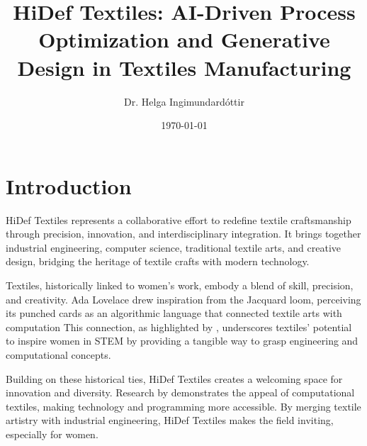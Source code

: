 \documentclass{article}
\title{HiDef Textiles: AI-Driven Process Optimization and Generative Design in Textiles Manufacturing}
\author{Dr. Helga Ingimundardóttir}
\date{\today}
\begin{document}
    \maketitle



    \section{Introduction}

    HiDef Textiles represents a collaborative effort to redefine textile craftsmanship through precision, innovation,
    and interdisciplinary integration. It brings together industrial engineering, computer science, traditional
    textile arts, and creative design, bridging the heritage of textile crafts with modern technology.

    Textiles, historically linked to women's work, embody a blend of skill, precision, and creativity. Ada Lovelace
    drew inspiration from the Jacquard loom, perceiving its punched cards as an algorithmic language that connected
    textile arts with computation
    This connection, as highlighted by \citet{sadieplant}, underscores textiles' potential to inspire women in STEM by
    providing a tangible way to grasp engineering and computational concepts.

    Building on these historical ties, HiDef Textiles creates a welcoming space for innovation and diversity.
    Research by \citet{qiu2013,keune2022} demonstrates the appeal of computational
    textiles, making technology and programming more accessible. By merging textile artistry with industrial
    engineering, HiDef Textiles makes the field inviting, especially for women.
\end{document}
